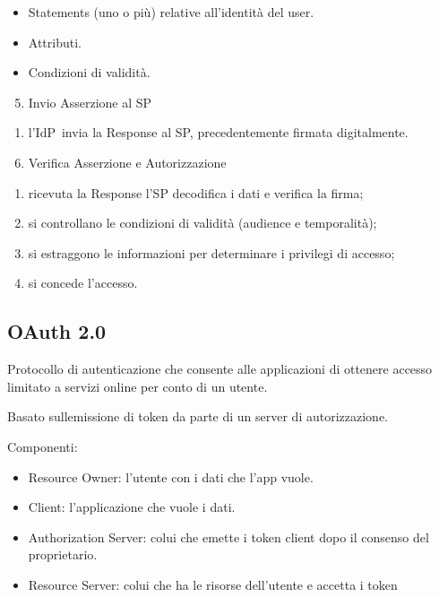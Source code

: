 \documentclass[
]{article}
\providecommand{\tightlist}{%
  \setlength{\itemsep}{0pt}\setlength{\parskip}{0pt}}
\begin{document}
\begin{itemize}
\tightlist
\item
  {Statements (uno o più) relative all'identità del user.}
\item
  {Attributi.}
\item
  {Condizioni di validità.}
\end{itemize}

\begin{enumerate}
\setcounter{enumi}{4}
\tightlist
\item
  {Invio Asserzione al SP}
\end{enumerate}

\begin{enumerate}
\tightlist
\item
  {l'IdP}{~invia la Response al SP, precedentemente firmata
  digitalmente.}
\end{enumerate}

{}

\begin{enumerate}
\setcounter{enumi}{5}
\tightlist
\item
  {Verifica Asserzione e Autorizzazione}
\end{enumerate}

\begin{enumerate}
\tightlist
\item
  {ricevuta la Response l'SP decodifica i dati e verifica la firma;}
\item
  {si controllano le condizioni di validità (audience e temporalità);}
\item
  {si estraggono le informazioni per determinare i privilegi di
  accesso;}
\item
  {si concede l'accesso.}
\end{enumerate}

\subsection{\texorpdfstring{{OAuth
2.0}}{OAuth 2.0}}\label{h.uywzdp5q5rwe}

{Protocollo di autenticazione che consente alle applicazioni di ottenere
accesso limitato a servizi online per conto di un utente. }

{}

{Basato sull\textquotesingle emissione di token da parte di un server di
autorizzazione.}

{}

{Componenti:}

\begin{itemize}
\tightlist
\item
  {Resource Owner}{: l'utente con i dati che l'app vuole.}
\item
  {Client}{: l'applicazione che vuole i dati.}
\item
  {Authorization Server}{: colui che emette i token client dopo il
  consenso del proprietario.}
\item
  {Resource Server}{: colui che ha le risorse dell'utente e accetta i
  token}
\end{itemize}
\end{document}
